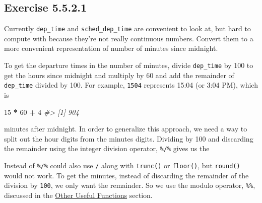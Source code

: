 \documentclass[]{book}
\newenvironment{Shaded}{\begin{snugshade}}{\end{snugshade}}
\newcommand{\CommentTok}[1]{\textcolor[rgb]{0.56,0.35,0.01}{\textit{#1}}}
\newcommand{\DecValTok}[1]{\textcolor[rgb]{0.00,0.00,0.81}{#1}}
\newcommand{\OperatorTok}[1]{\textcolor[rgb]{0.81,0.36,0.00}{\textbf{#1}}}
\newcommand{\StringTok}[1]{\textcolor[rgb]{0.31,0.60,0.02}{#1}}
\theoremstyle{plain}
\theoremstyle{remark}
\begin{document}
\hypertarget{exercise-5.5.2.1}{%
\subsection*{\texorpdfstring{Exercise {5.5.2.1}}{Exercise 5.5.2.1}}\label{exercise-5.5.2.1}}

Currently \texttt{dep\_time} and \texttt{sched\_dep\_time} are convenient to look at, but hard to compute with because they're not really continuous numbers. Convert them to a more convenient representation of number of minutes since midnight.

To get the departure times in the number of minutes, divide \texttt{dep\_time} by 100 to get the hours since midnight and multiply by 60 and add the remainder of \texttt{dep\_time} divided by 100.
For example, \texttt{1504} represents 15:04 (or 3:04 PM), which is

\begin{Shaded}
\begin{Highlighting}[]
\DecValTok{15} \OperatorTok{*}\StringTok{ }\DecValTok{60} \OperatorTok{+}\StringTok{ }\DecValTok{4}
\CommentTok{#> [1] 904}
\end{Highlighting}
\end{Shaded}

minutes after midnight.
In order to generalize this approach, we need a way to split out the hour digits from the minutes digits.
Dividing by 100 and discarding the remainder using the integer division operator, \texttt{\%/\%} gives us the

\begin{Shaded}
\end{Shaded}

Instead of \texttt{\%/\%} could also use \texttt{/} along with \texttt{trunc()} or \texttt{floor()}, but \texttt{round()} would not work.
To get the minutes, instead of discarding the remainder of the division by \texttt{100},
we only want the remainder.
So we use the modulo operator, \texttt{\%\%}, discussed in the \href{http://r4ds.had.co.nz/transform.html\#select}{Other Useful Functions} section.

\begin{Shaded}
\end{Shaded}
\end{document}
